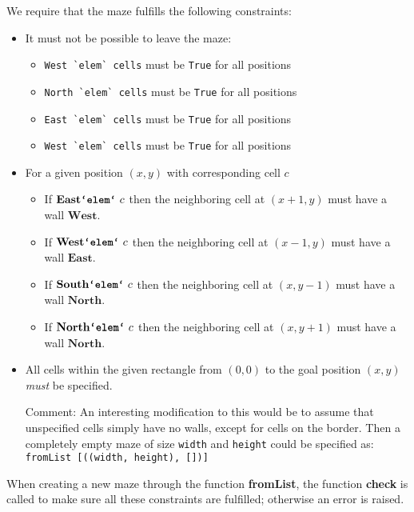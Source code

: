 \documentclass[a4paper]{article}
\newcommand{\west}{\ensuremath{\textbf{West}}\xspace}
\newcommand{\east}{\ensuremath{\textbf{East}}\xspace}
\newcommand{\south}{\ensuremath{\textbf{South}}\xspace}
\newcommand{\north}{\ensuremath{\textbf{North}}\xspace}
\newcommand{\el}{\ensuremath{\textbf{`elem`}}\xspace}
\newcommand{\src}[1]{\texttt{#1}\xspace}
\newcommand{\func}[1]{\textbf{\ttfamily #1}\xspace}
\begin{document}
We require that the maze fulfills the following constraints:  

\begin{itemize}
  \item It must not be possible to leave the maze:
    \begin{itemize}\setlength{\itemsep}{-2pt}
      \item \verb|West `elem` cells| must be \texttt{True} for all positions 
      \item \verb|North `elem` cells| must be \texttt{True} for all positions 
      \item \verb|East `elem` cells| must be \texttt{True} for all positions 
      \item \verb|West `elem` cells| must be \texttt{True} for all positions 
    \end{itemize}
  \item For a given position $(x,y)$ with corresponding cell $c$
    \begin{itemize}\setlength{\itemsep}{-2pt}
      \item If $\east \text{\func{`elem`} } c$ then the neighboring cell at $(x+1,y)$ must have a wall \west.
      \item If $\west \text{\func{`elem`} } c$ then the neighboring cell at $(x-1,y)$ must have a wall \east.
      \item If $\south \text{\func{`elem`} } c$ then the neighboring cell at $(x,y-1)$ must have a wall \north.
      \item If $\north \text{\func{`elem`} } c$ then the neighboring cell at $(x,y+1)$ must have a wall \north.
    \end{itemize}
  \item All cells within the given rectangle from $(0,0)$ to the goal
    position $(x,y)$ \emph{must} be specified.

    Comment: An interesting modification to this would be to assume that unspecified cells
    simply have no walls, except for cells on the border. Then a
    completely empty maze of size \src{width} and \src{height} could
    be specified as: \src{\scriptsize fromList [((width, height), [])]}
\end{itemize}
When creating a new maze through the function \textbf{fromList}, the function \textbf{check} is called to make sure all these constraints are fulfilled; otherwise an error is raised.
\end{document}
